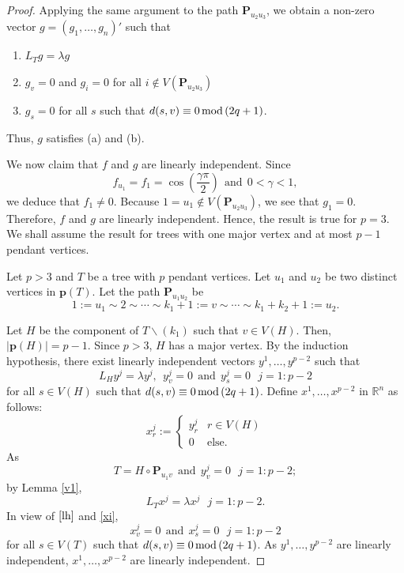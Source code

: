 \documentclass[preprint,12pt]{elsarticle}
\newcommand{\1}{\mathbf{1}}
\newcommand{\0}{\mathbf{0}}
\newcommand{\p}{{\mathbf{P}}}
\def\pt{\mathbf{p}}
\def\p{\mathbf{P}}
\begin{document}
\begin{proof}
Applying the same argument to the path $\p_{u_2u_3}$,
we obtain a non-zero vector $g=(g_1,\dotsc,g_n)'$ such that
\begin{enumerate}
\item[(i)] $L_Tg=\lambda g$ 
\item[(ii)] $g_v=0$ and $g_i=0$ for all $i\notin V(\p_{u_2u_3})$ 
\item[(iii)] $g_s=0$ for all $s$ such that
$d(s,v)\equiv 0\,{\rm{mod}}\,(2q+1)$.
\end{enumerate}
Thus, $g$ satisfies (a) and (b).

We now claim that $f$ and $g$ are linearly independent.
Since
\[f_{u_1}=f_1=\cos\left(\frac{\gamma \pi}{2} \right) ~~\mbox{and} ~~0<\gamma<1,\]
we deduce that $f_1 \neq 0$.
Because
 $1=u_1 \notin V(\p_{u_2u_3})$, we see that
$g_1=0$.
Therefore, $f$ and $g$ are linearly independent.
Hence, the result is true for $p=3$.
We shall assume the result for trees with one major vertex and at most $p-1$ pendant vertices. 

Let $p>3$ and
$T$ be a tree with
$p$ pendant vertices. Let $u_1$ and $u_2$ be two distinct vertices in $\pt(T)$. Let the path $\p_{u_1u_2}$ be 
\[1:=u_1 \sim 2 \sim  \cdots \sim k_1+1:=v \sim \cdots \sim k_1+k_2+1:=u_2.\] 




Let $H$ be the component of $T\smallsetminus ({k_1})$ such that $v\in V(H)$. 
Then, $|\pt(H)|=p-1$. 
Since $p>3$, $H$ has a major vertex. 
By the induction hypothesis,
there exist linearly independent vectors $y^1,\dots,y^{p-2}$ such that
\begin{equation} \label{lh}
L_Hy^j=\lambda y^j,~~y^{j}_v=0~~\mbox{and}~~y^{j}_s=0~~~j=1:p-2
\end{equation}
for all $s \in V(H)$ such that
$d(s,v)\equiv 0\,{\rm{mod}}\,(2q+1)$.
Define $x^1,\dots,x^{p-2}$ in $\mathbb{R}^n$ as follows:
\begin{equation}\label{xi}
x^j_r:=
\begin{cases}
y^j_r & r\in V(H) \\
0 & \mbox{else.}
\end{cases}    
\end{equation}
As \[T=H\circ \p_{u_1v}~~\mbox{and}~~
y^j_v=0 ~~~ j=1:p-2;\] 
by Lemma \ref{v1}, 
\[L_T x^j=\lambda x^j~~~j=1:p-2.\]
In view of $\eqref{lh}$ and \eqref{xi},
\[x^j_v=0 ~~\mbox{and}~~x^j_s=0~~~j=1:p-2\]
for all $s\in V(T)$
such that $d(s,v) \equiv 0\,{\rm{mod}}\,(2q+1)$.
As $y^1,\dotsc,y^{p-2}$ are 
linearly independent, $x^1,\dotsc,x^{p-2}$
are linearly independent.


\end{proof}
\end{document}
